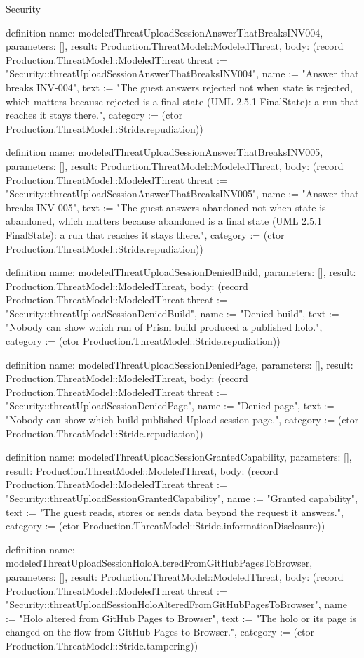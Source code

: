 \begin{lexlean}{Security}
\begin{semanticmodule}
definition{
  name: modeledThreatUploadSessionAnswerThatBreaksINV004,
  parameters: [],
  result: Production.ThreatModel::ModeledThreat,
  body: (record Production.ThreatModel::ModeledThreat {threat := "Security::threatUploadSessionAnswerThatBreaksINV004", name := "Answer that breaks INV-004", text := "The guest answers rejected not when state is rejected, which matters because rejected is a final state (UML 2.5.1 FinalState): a run that reaches it stays there.", category := (ctor Production.ThreatModel::Stride.repudiation)})
}

definition{
  name: modeledThreatUploadSessionAnswerThatBreaksINV005,
  parameters: [],
  result: Production.ThreatModel::ModeledThreat,
  body: (record Production.ThreatModel::ModeledThreat {threat := "Security::threatUploadSessionAnswerThatBreaksINV005", name := "Answer that breaks INV-005", text := "The guest answers abandoned not when state is abandoned, which matters because abandoned is a final state (UML 2.5.1 FinalState): a run that reaches it stays there.", category := (ctor Production.ThreatModel::Stride.repudiation)})
}

definition{
  name: modeledThreatUploadSessionDeniedBuild,
  parameters: [],
  result: Production.ThreatModel::ModeledThreat,
  body: (record Production.ThreatModel::ModeledThreat {threat := "Security::threatUploadSessionDeniedBuild", name := "Denied build", text := "Nobody can show which run of Prism build produced a published holo.", category := (ctor Production.ThreatModel::Stride.repudiation)})
}

definition{
  name: modeledThreatUploadSessionDeniedPage,
  parameters: [],
  result: Production.ThreatModel::ModeledThreat,
  body: (record Production.ThreatModel::ModeledThreat {threat := "Security::threatUploadSessionDeniedPage", name := "Denied page", text := "Nobody can show which build published Upload session page.", category := (ctor Production.ThreatModel::Stride.repudiation)})
}

definition{
  name: modeledThreatUploadSessionGrantedCapability,
  parameters: [],
  result: Production.ThreatModel::ModeledThreat,
  body: (record Production.ThreatModel::ModeledThreat {threat := "Security::threatUploadSessionGrantedCapability", name := "Granted capability", text := "The guest reads, stores or sends data beyond the request it answers.", category := (ctor Production.ThreatModel::Stride.informationDisclosure)})
}

definition{
  name: modeledThreatUploadSessionHoloAlteredFromGitHubPagesToBrowser,
  parameters: [],
  result: Production.ThreatModel::ModeledThreat,
  body: (record Production.ThreatModel::ModeledThreat {threat := "Security::threatUploadSessionHoloAlteredFromGitHubPagesToBrowser", name := "Holo altered from GitHub Pages to Browser", text := "The holo or its page is changed on the flow from GitHub Pages to Browser.", category := (ctor Production.ThreatModel::Stride.tampering)})
}


\end{semanticmodule}
\end{lexlean}
